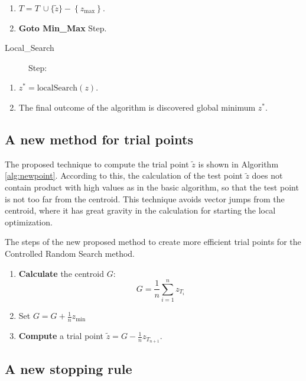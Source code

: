 \documentclass[symmetry,article,submit,moreauthors,pdftex]{Definitions/mdpi}
\begin{document}
\begin{algorithm}
\begin{description}
\end{description}
\begin{enumerate}
\item $T=T\ \cup\{\tilde{z}\}-\left\{ z_{\mbox{max}}\right\} $.
\item \textbf{Goto Min\_Max} Step.
\end{enumerate}
\begin{description}
\item [{Local\_Search}] Step:
\end{description}
\begin{enumerate}
\item $z^{*}=\mbox{localSearch}(z)$.
\item The final outcome of the algorithm is discovered global minimum $z^{*}$.
\end{enumerate}
\end{algorithm}


\subsection{A new method for trial points\label{subsec:A-new-method}}

The proposed technique to compute the trial point $\tilde{z}$ is
shown in Algorithm \ref{alg:newpoint}. According to this, the calculation
of the test point $\tilde{z}$ does not contain product with high
values as in the basic algorithm, so that the test point is not too
far from the centroid. This technique avoids vector jumps from the
centroid, where it has great gravity in the calculation for starting
the local optimization.

\begin{algorithm}

\caption{The steps of the new proposed method to create more efficient trial points for the Controlled Random Search method.\label{alg:newpoint}}

\begin{enumerate}
\item \textbf{Calculate} the centroid $G$: 
\[
G=\frac{1}{n}\sum_{i=1}^{n}z_{T_{i}}
\]
\item Set $G=G+\frac{1}{n}z_{\mbox{min}}$
\item \textbf{Compute} a trial point $\tilde{z}=G-\frac{1}{n}z_{T_{n+1}}$.
\end{enumerate}
\end{algorithm}


\subsection{A new stopping rule \label{subsec:A-new-stopping}}
\end{document}
